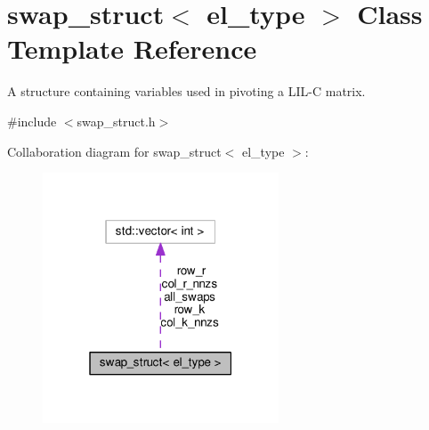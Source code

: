 \hypertarget{classswap__struct}{}\section{swap\+\_\+struct$<$ el\+\_\+type $>$ Class Template Reference}
\label{classswap__struct}


A structure containing variables used in pivoting a L\+I\+L-\/C matrix.  




{\ttfamily \#include $<$swap\+\_\+struct.\+h$>$}



Collaboration diagram for swap\+\_\+struct$<$ el\+\_\+type $>$\+:
\nopagebreak
\begin{figure}[H]
\begin{center}
\leavevmode
\includegraphics[width=199pt]{classswap__struct__coll__graph}
\end{center}
\end{figure}
